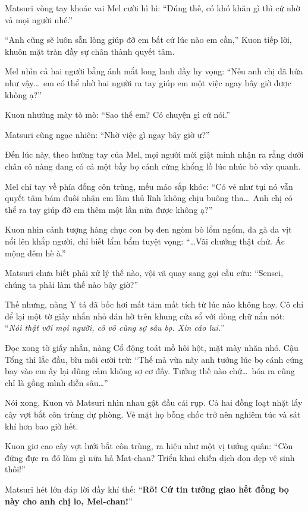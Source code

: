 \documentclass[../main.tex]{subfiles}
\begin{document}
Matsuri vòng tay khoác vai Mel cười hì hì:
``Đúng thế, có khó khăn gì thì cứ nhờ vả mọi người nhé.''

``Anh cũng sẽ luôn sẵn lòng giúp đỡ em bất cứ lúc nào em cần,'' Kuon tiếp lời, khuôn mặt tràn đầy sự chân thành quyết tâm.

Mel nhìn cả hai người bằng ánh mắt long lanh đầy hy vọng:
``Nếu anh chị đã hứa như vậy\dots\ em có thể nhờ hai người ra tay giúp em một việc ngay bây giờ được không ạ?''

Kuon nhướng mày tò mò:
``Sao thế em? Có chuyện gì cứ nói.''

Matsuri cũng ngạc nhiên:
``Nhờ việc gì ngay bây giờ ư?''

Đến lúc này, theo hướng tay của Mel, mọi người mới giật mình nhận ra rằng dưới chân cô nàng đang có cả một bầy bọ cánh cứng khổng lồ lúc nhúc bò vây quanh.


Mel chỉ tay về phía đống côn trùng, mếu máo sắp khóc:
``Có vẻ như tụi nó vẫn quyết tâm bám đuôi nhận em làm thủ lĩnh không chịu buông tha\dots\ Anh chị có thể ra tay giúp đỡ em thêm một lần nữa được không ạ?''

Kuon nhìn cảnh tượng hàng chục con bọ đen ngòm bò lổm ngổm, da gà da vịt nổi lên khắp người, chỉ biết lẩm bẩm tuyệt vọng:
``\dots Vãi chưởng thật chứ. Ác mộng đêm hè à.''

Matsuri chưa biết phải xử lý thế nào, vội vã quay sang gọi cầu cứu:
``Sensei, chúng ta phải làm thế nào bây giờ?''

Thế nhưng, nàng Y tá đã bốc hơi mất tăm mất tích từ lúc nào không hay. Cô chỉ để lại một tờ giấy nhắn nhỏ dán hờ trên khung cửa sổ với dòng chữ nắn nót: ``\textit{Nói thật với mọi người, cô vô cùng sợ sâu bọ. Xin cáo lui.}''

Đọc xong tờ giấy nhắn, nàng Cổ động toát mồ hôi hột, mặt mày nhăn nhó. Cậu Tổng thì lắc đầu, bĩu môi cười trừ:
``Thế mà vừa nãy anh tưởng lúc bọ cánh cứng bay vào em ấy lại dũng cảm không sợ cơ đấy. Tưởng thế nào chứ\dots\ hóa ra cũng chỉ là gồng mình diễn sâu\dots''

Nói xong, Kuon và Matsuri nhìn nhau gật đầu cái rụp. Cả hai đồng loạt nhặt lấy cây vợt bắt côn trùng dự phòng. Vẻ mặt họ bỗng chốc trở nên nghiêm túc và sát khí hơn bao giờ hết.

Kuon giơ cao cây vợt lưới bắt côn trùng, ra hiệu như một vị tướng quân:
``Còn đứng đực ra đó làm gì nữa hả Mat-chan? Triển khai chiến dịch dọn dẹp vệ sinh thôi!''

Matsuri hét lớn đáp lời đầy khí thế:
``\textbf{Rõ! Cứ tin tưởng giao hết đống bọ này cho anh chị lo, Mel-chan!}''
\end{document}
